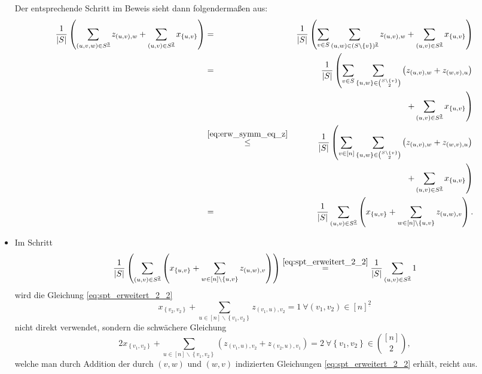 \documentclass[10p,a4paper,BCOR = 12mm, DIV=15]{scrbook}
\begin{document}
\begin{itemize}
Der entsprechende Schritt im Beweis sieht dann folgendermaßen aus:
\begin{eqnarray*}
\frac{1}{\left|S\right|} \left(\sum_{\left(u, v, w\right) \in S^{\underline{3}}} z_{\left(u, v\right), w} + \sum_{\left(u, v\right) \in S^{\underline{2}}} x_{\left\{u, v\right\}} \right) & = & \frac{1}{\left|S\right|} \left(
\sum_{v \in S} \sum_{\left(u, w\right) \in \left(S \backslash \left\{v\right\}\right)^{\underline{2}}} z_{\left(u, v\right), w} + \sum_{\left(u, v\right) \in S^{\underline{2}}} x_{\left\{u, v\right\}} \right) \\
& = & \frac{1}{\left|S\right|} \left(
\sum_{v \in S} \sum_{\left\{u, w\right\} \in {S \backslash \left\{v\right\} \choose 2}} \left(z_{\left(u, v\right), w} + z_{\left(w, v\right), u}\right) \right. \\
& & \left. + \sum_{\left(u, v\right) \in S^{\underline{2}}} x_{\left\{u, v\right\}} \right) \\
& \stackrel{\eqref{eq:erw_symm_eq_z}}{\leq} & \frac{1}{\left|S\right|} \left(
\sum_{v \in \left[n\right]} \sum_{\left\{u, w\right\} \in {S \backslash \left\{v\right\} \choose 2}} \left(z_{\left(u, v\right), w} + z_{\left(w, v\right), u}\right) \right. \\
& & \left. + \sum_{\left(u, v\right) \in S^{\underline{2}}} x_{\left\{u, v\right\}} \right) \\
& = & \frac{1}{\left|S\right|} \sum_{\left(u, v\right) \in S^{\underline{2}}} \left( x_{\left\{u, v\right\}} + \sum_{w \in \left[n\right] \backslash \left\{u, v\right\}} z_{\left(u, w\right), v} 
\right).
\end{eqnarray*}
\item Im Schritt
\begin{displaymath}
\frac{1}{\left|S\right|} \left(\sum_{\left(u, v\right) \in S^{\underline{2}}} \left( x_{\left\{u, v\right\}} + \sum_{w \in \left[n\right] \backslash \left\{u, v\right\}} z_{\left(u, w\right), v} 
\right)\right)
\stackrel{\eqref{eq:spt_erweitert_2_2}}{=}
\frac{1}{\left|S\right|} \sum_{\left(u, v\right) \in S^{\underline{2}}} 1
\end{displaymath}
wird die Gleichung \eqref{eq:spt_erweitert_2_2}
\begin{displaymath}
x_{\left\{v_2, v_2\right\}} + \sum_{u\in[n]\backslash\left\{v_1, v_2\right\}} z_{\left(v_1, u\right), v_2} = 1\ \forall \left(v_1, v_2\right)\in [n]^{\underline{2}}
\end{displaymath}
nicht direkt verwendet, sondern die schwächere Gleichung
\begin{equation}
2 x_{\left\{v_1, v_2\right\}} + \sum_{u\in[n]\backslash\left\{v_1, v_2\right\}} \left(z_{\left(v_1, u\right), v_2} + z_{\left(v_2, u\right), v_1} \right) = 2\ \forall \left\{v_1, v_2\right\}\in {[n] \choose 2}, \label{eq:erw_symm_eq_neu2}
\end{equation}
welche man durch Addition der durch $\left(v, w\right)$ und $\left(w, v\right)$ indizierten Gleichungen \eqref{eq:spt_erweitert_2_2} erhält, reicht aus.


\end{itemize}
\end{document}

